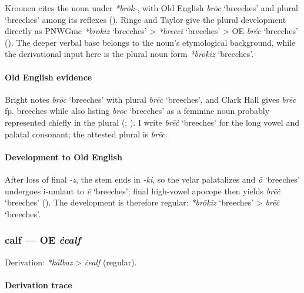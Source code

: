 \documentclass[
  british,
  a4paper,
]{article}
\providecommand{\Recon}[1]{\emph{*#1}}
\begin{document}
Kroonen cites the noun under \emph{*brōk-}, with Old English \emph{brōc}
`breeches' and plural `breeches' among its reflexes
(). Ringe and Taylor give the
plural development directly as PNWGmc \Recon{brōkiz} `breeches'
\textgreater{} \Recon{breeci} `breeches' \textgreater{} OE \emph{bréc}
`breeches' (). The
deeper verbal base belongs to the noun's etymological background, while
the derivational input here is the plural noun form \Recon{brōkiz}
`breeches'.

\paragraph{Old English evidence}\label{old-english-evidence-10}

Bright notes \emph{brōc} `breeches' with plural \emph{brēc} `breeches',
and Clark Hall gives \emph{brēc} fp. breeches while also listing
\emph{broc} `breeches' as a feminine noun probably represented chiefly
in the plural (;
). I write \emph{brēċ}
`breeches' for the long vowel and palatal consonant; the attested plural
is \emph{brēc}.

\paragraph{Development to Old
English}\label{development-to-old-english-10}

After loss of final \emph{-z}, the stem ends in \emph{-ki}, so the velar
palatalizes and \emph{ō} `breeches' undergoes i-umlaut to \emph{ē}
`breeches'; final high-vowel apocope then yields \emph{brēċ} `breeches'
(). The development
is therefore regular: \Recon{brōkiz} `breeches' \textgreater{}
\emph{brēċ} `breeches'.

\subsubsection{\texorpdfstring{calf --- OE
\emph{ċealf}}{calf --- OE ċealf}}\label{calf-oe-ux10bealf}

Derivation: \emph{*kálbaz} \textgreater{} \emph{ċealf} (regular).

\paragraph{Derivation trace}\label{derivation-trace-11}
\end{document}
